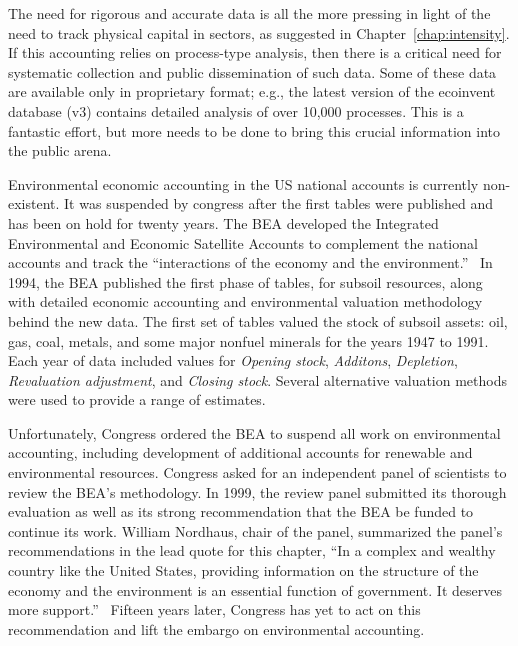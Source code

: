 The need for rigorous and accurate data
is all the more pressing in light of the need 
to track physical capital in sectors,
as suggested in Chapter~\ref{chap:intensity}.
If this accounting relies on process-type
analysis,
then there is a critical need for systematic
collection and public dissemination of such data.
Some of these data are available only in proprietary format;
e.g., the latest version of the ecoinvent database (v3)
contains detailed analysis of over 10,000 
processes.\cite{EcoInvent2012}
This is a fantastic effort, but more needs to be
done to bring this crucial information into the public arena.

Environmental economic accounting in the US national accounts is currently non-existent. 
It was suspended by congress after the first
tables were published and has been on hold for twenty years. 
The BEA developed the
Integrated Environmental and Economic Satellite Accounts 
to complement the national accounts and track the 
``interactions of the economy and the environment.''~\cite[p.~33]{BEA1994a} 
In 1994, the BEA published the first phase of tables, for subsoil resources, 
along with detailed economic accounting 
and environmental valuation methodology behind the new data.\cite{BEA1994a, BEA1994b} 
The first set of tables valued the stock of
subsoil assets: oil, gas, coal, metals, 
and some major nonfuel minerals for the years 1947 to 1991. Each
year of data included values for \emph{Opening stock}, 
\emph{Additons}, \emph{Depletion}, \emph{Revaluation adjustment}, 
and \emph{Closing stock}. 
Several alternative valuation methods were used to provide a range of estimates.

Unfortunately, Congress ordered the BEA
to suspend all work
on environmental accounting, including development of
additional accounts for renewable and environmental resources.  
Congress asked for an independent panel of scientists to review the 
BEA's methodology.
In 1999, the review panel submitted its thorough evaluation as well as its strong
recommendation that the BEA
be funded to continue its work.\cite{Nordhaus1999a}
William Nordhaus,
chair of the panel, summarized the panel's recommendations 
in the lead quote for this chapter, 
``In a complex and wealthy country like the United States, 
providing information on the structure of the economy and the environment 
is an essential function of government. 
It deserves more support.''~\cite[p.~49]{Nordhaus:1999aa}
Fifteen years later, Congress has yet to act on this recommendation 
and lift the embargo on environmental accounting.

